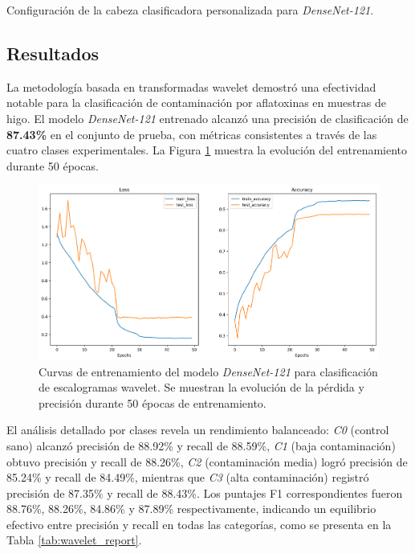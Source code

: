 \begin{table}[ht]
\centering
\caption{Configuración de la cabeza clasificadora personalizada para \emph{DenseNet-121}.}
\label{tab:custom_layers}
\end{table}

\subsection{Resultados}

La metodología basada en transformadas wavelet demostró una efectividad notable para la clasificación de contaminación por aflatoxinas en muestras de higo. El modelo \emph{DenseNet-121} entrenado alcanzó una precisión de clasificación de \textbf{87.43\%} en el conjunto de prueba, con métricas consistentes a través de las cuatro clases experimentales. La Figura \ref{fig:wavelet_training_results} muestra la evolución del entrenamiento durante 50 épocas.

\begin{figure}[ht]
\centering
\includegraphics[width=\textwidth]{images/wavelet_training_results.png}
\caption{Curvas de entrenamiento del modelo \emph{DenseNet-121} para clasificación de escalogramas wavelet. Se muestran la evolución de la pérdida y precisión durante 50 épocas de entrenamiento.}
\label{fig:wavelet_training_results}
\end{figure}

\vspace{5mm}

El análisis detallado por clases revela un rendimiento balanceado: \emph{C0} (control sano) alcanzó precisión de 88.92\% y recall de 88.59\%, \emph{C1} (baja contaminación) obtuvo precisión y recall de 88.26\%, \emph{C2} (contaminación media) logró precisión de 85.24\% y recall de 84.49\%, mientras que \emph{C3} (alta contaminación) registró precisión de 87.35\% y recall de 88.43\%. Los puntajes F1 correspondientes fueron 88.76\%, 88.26\%, 84.86\% y 87.89\% respectivamente, indicando un equilibrio efectivo entre precisión y recall en todas las categorías, como se presenta en la Tabla \ref{tab:wavelet_report}.

